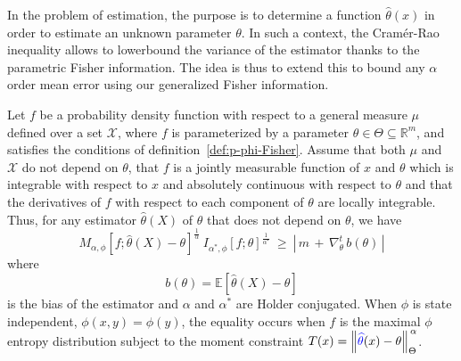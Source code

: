 \documentclass[entropy,article,submit,moreauthors,pdftex]{Definitions/mdpi}
\newcommand{\SZ}[1]{{\color{blue} #1}}                                       %
\def\Rset{\mathbb{R}}%
\def\X{\mathcal{X}}%
\newcommand{\Esp}[1]{\mathbb{E}\left[ #1 \right]}%
\begin{document}
In  the  problem  of  estimation,  the   purpose  is  to  determine  a  function
$\hat{\theta}(x)$ in order to estimate an  unknown parameter $\theta$. In such a
context, the  Cram\'er-Rao inequality allows  to lowerbound the variance  of the
estimator thanks  to the  parametric Fisher  information.  The  idea is  thus to
extend this to bound any $\alpha$  order mean error using our generalized Fisher
information.
%
\begin{Proposition}
\label{prop:p-phi-CR}
  Let $f$  be a probability density  function with respect to  a general measure
  $\mu$  defined over  a set  $\X$, where  $f$ is  parameterized by  a parameter
  $\theta  \in  \Theta  \subseteq  \Rset^m$, and  satisfies  the  conditions  of
  definition~\ref{def:p-phi-Fisher}.   Assume that  both $\mu$  and $\X$  do not
  depend  on $\theta$,  that $f$  is a  jointly measurable  function of  $x$ and
  $\theta$  \SZ{which} is  integrable with  respect to  $x$ \SZ{and}  absolutely
continuous with  respect to $\theta$ and  that the derivatives \SZ{of  $f$} with
respect to  each component of  $\theta$ are  locally integrable.  Thus,  for any
estimator $\widehat{\theta}(X)$ of $\theta$ that does not depend on $\theta$, we
have
  \begin{equation}\label{eq:phi-CR}
  M_{\alpha,\phi} \! \left[ f ; \widehat{\theta}(X) - \theta
    \right]^{\frac{1}{\alpha}} \:
  I_{\alpha^*\!,\phi}[f;\theta]^{\frac{1}{\alpha^*}} \: \ge \: \left| \, m \, +
  \, \nabla_\theta^t \, b(\theta) \, \right|
  \end{equation}
  where
  \begin{equation}
  b(\theta) = \Esp{\widehat{\theta}(X) - \theta}
  \end{equation}
  is  the  bias  of  the  estimator  and  $\alpha$  and  $\alpha^*$  are  Holder
  conjugated.   When $\phi$  is state  independent, $\phi(x,y)  = \phi(y)$,  the
  equality occurs when $f$ is the maximal $\phi$ entropy distribution subject to
  the moment constraint $T(x) = \left\| \SZ{\widehat{\theta}}(x) - \theta \right\|_{\Theta}^{\,
    \alpha}$.
\end{Proposition}
%
\end{document}
